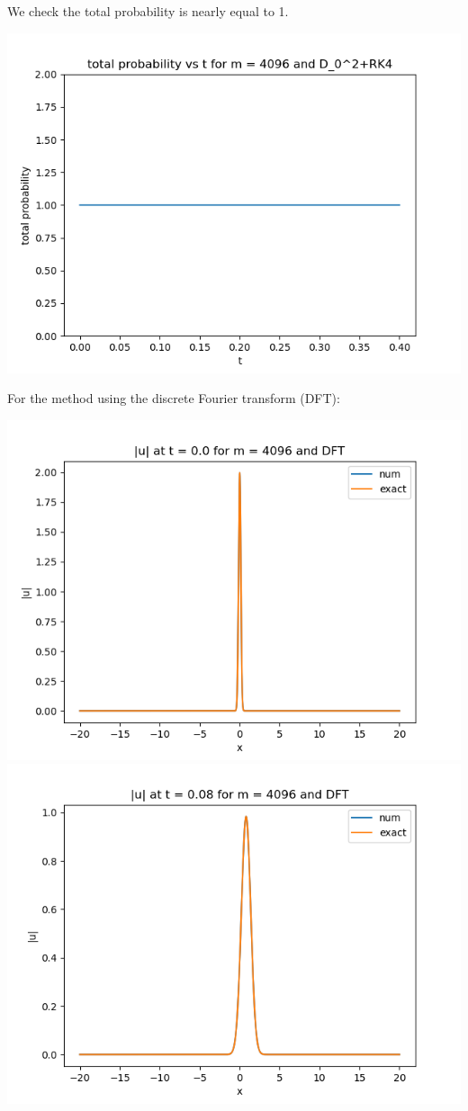 \documentclass{article}
\begin{document}
\begin{enumerate}[label=(\alph*)]
\begin{center}
\end{center}
We check the total probability is nearly equal to 1.
\begin{center}
	\includegraphics[scale=.5]{FINAL prob m = 4096 D02+RK4}
\end{center}
For the method using the discrete Fourier transform (DFT):
\begin{center}
	\includegraphics[scale=.3]{FINAL u_abs t = 0.0 m = 4096 DFT}
	\includegraphics[scale=.3]{FINAL u_abs t = 0.08 m = 4096 DFT}

\end{center}
\end{enumerate}
\end{document}

